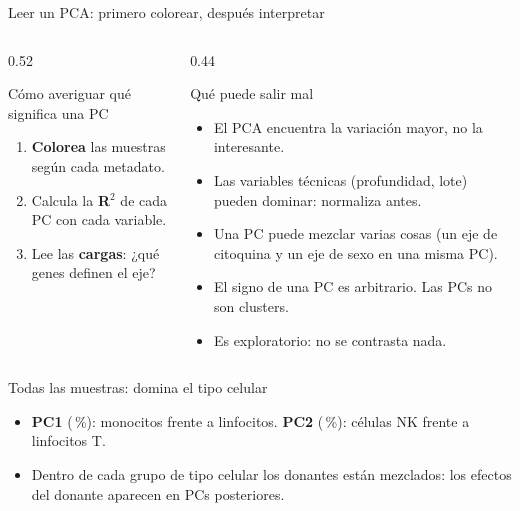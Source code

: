 \begin{frame}{Leer un PCA: primero colorear, después interpretar}
  \begin{columns}[T]
    \begin{column}{0.52\linewidth}
      \begin{block}{Cómo averiguar qué significa una PC}
        \small
        \begin{enumerate}\setlength\itemsep{3pt}
          \item \textbf{Colorea} las muestras según cada metadato.
          \item Calcula la \textbf{R$^2$} de cada PC con cada variable.
          \item Lee las \textbf{cargas}: ¿qué genes definen el eje?
        \end{enumerate}
      \end{block}
    \end{column}
    \begin{column}{0.44\linewidth}
      \begin{block}{Qué puede salir mal}
        \footnotesize
        \begin{itemize}\setlength\itemsep{2pt}
          \item El PCA encuentra la variación \alert{mayor}, no la interesante.
          \item Las variables técnicas (profundidad, lote) pueden dominar: normaliza antes.
          \item Una PC puede mezclar varias cosas (un eje de citoquina y un eje de sexo en una misma PC).
          \item El signo de una PC es arbitrario. Las PCs no son clusters.
          \item Es exploratorio: no se contrasta nada.
        \end{itemize}
      \end{block}
    \end{column}
  \end{columns}
\end{frame}

\begin{frame}{Todas las muestras: domina el tipo celular}
  \centering
  \begin{itemize}\small\setlength\itemsep{2pt}
    \item \textbf{PC1} (\numpcaone\,\%): monocitos frente a linfocitos. \textbf{PC2} (\numpcatwo\,\%): células NK frente a linfocitos T.
    \item Dentro de cada grupo de tipo celular los \alert{donantes están mezclados}: los efectos del donante aparecen en PCs posteriores.
  \end{itemize}
\end{frame}

